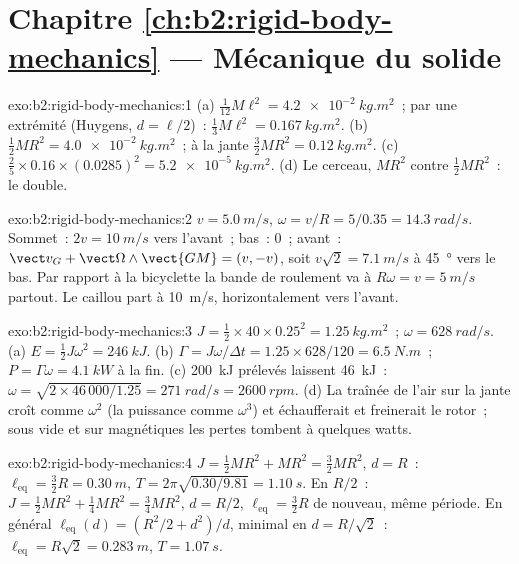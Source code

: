 \section*{Chapitre \ref{ch:b2:rigid-body-mechanics} --- Mécanique du solide}

\begin{solution}{exo:b2:rigid-body-mechanics:1}
(a) $\tfrac1{12}M\ell^2 = \qty{4.2e-2}{kg.m^2}$~; par une extrémité (Huygens,
$d = \ell/2$)~: $\tfrac13M\ell^2 = \qty{0.167}{kg.m^2}$. (b) $\tfrac12MR^2 =
\qty{4.0e-2}{kg.m^2}$~; à la jante $\tfrac32MR^2 = \qty{0.12}{kg.m^2}$.
(c) $\tfrac25 \times 0.16 \times (0.0285)^2 = \qty{5.2e-5}{kg.m^2}$. (d) Le
cerceau, $MR^2$ contre $\tfrac12MR^2$~: le double.
\end{solution}

\begin{solution}{exo:b2:rigid-body-mechanics:2}
$v = \qty{5.0}{m/s}$, $\omega = v/R = 5/0.35 = \qty{14.3}{rad/s}$. Sommet~:
$2v = \qty{10}{m/s}$ vers l'avant~; bas~: $0$~; avant~: $\vect v_G + \vect\Omega
\wedge\vect{GM} = (v, -v)$, soit $v\sqrt2 = \qty{7.1}{m/s}$ à
\qty{45}{\degree} vers le bas. Par rapport à la bicyclette la bande de roulement va à
$R\omega = v = \qty{5}{m/s}$ partout. Le caillou part à \qty{10}{m/s},
horizontalement vers l'avant.
\end{solution}

\begin{solution}{exo:b2:rigid-body-mechanics:3}
$J = \tfrac12 \times 40 \times 0.25^2 = \qty{1.25}{kg.m^2}$~; $\omega = \qty{628}{rad/s}$.
(a) $E = \tfrac12J\omega^2 = \qty{246}{kJ}$. (b) $\Gamma = J\omega/\Delta t =
1.25 \times 628/120 = \qty{6.5}{N.m}$~; $P = \Gamma\omega = \qty{4.1}{kW}$ à la fin.
(c) \qty{200}{kJ} prélevés laissent \qty{46}{kJ}~: $\omega = \sqrt{2 \times 46\,000/1.25}
= \qty{271}{rad/s} = \qty{2600}{rpm}$. (d) La traînée de l'air sur la jante croît comme
$\omega^2$ (la puissance comme $\omega^3$) et échaufferait et freinerait le rotor~; sous
vide et sur  magnétiques les pertes tombent à quelques watts.
\end{solution}

\begin{solution}{exo:b2:rigid-body-mechanics:4}
$J = \tfrac12MR^2 + MR^2 = \tfrac32MR^2$, $d = R$~: $\ell_{\text{eq}} = \tfrac32R
= \qty{0.30}{m}$, $T = 2\pi\sqrt{0.30/9.81} = \qty{1.10}{s}$. En $R/2$~: $J =
\tfrac12MR^2 + \tfrac14MR^2 = \tfrac34MR^2$, $d = R/2$, $\ell_{\text{eq}} =
\tfrac32R$ de nouveau, même période. En général $\ell_{\text{eq}}(d) = (R^2/2 +
d^2)/d$, minimal en $d = R/\sqrt2$~: $\ell_{\text{eq}} = R\sqrt2 = \qty{0.283}{m}$,
$T = \qty{1.07}{s}$.
\end{solution}

